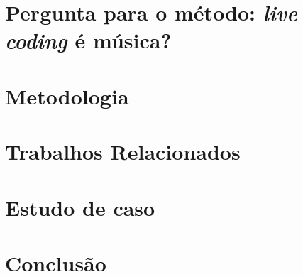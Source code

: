 \documentclass[
	12pt,				%
	openright,			%
	twoside,			%
	a4paper,			%
	english,			%
	french,				%
	spanish,			%
        italian,                        %
	brazil				%
	]{abntex2}
\begin{document}
\begingroup
\let\clearpage\relax
\chapter{Pergunta para o método: \emph{live coding} é música?}\label{cap:introducao}

\endgroup

\begingroup
\let\clearpage\relax
\chapter{Metodologia}\label{cap:metodologia}

\endgroup

\begingroup
\let\clearpage\relax
\chapter{Trabalhos Relacionados}\label{cap:trabalhos_relacionados}

\endgroup

\begingroup
\let\clearpage\relax
\chapter{Estudo de caso}\label{cap:estudos_de_caso}

\endgroup

\chapter{Conclusão}

\postextual



%
%



%

\printindex
\end{document}
